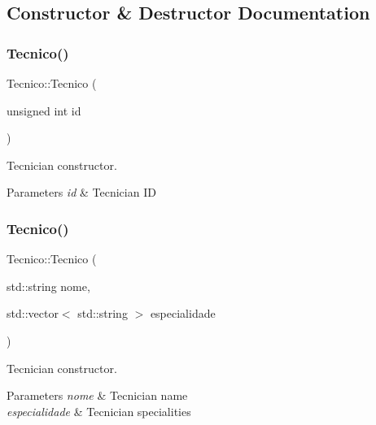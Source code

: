 \subsection{Constructor \& Destructor Documentation}
\mbox{\label{class_tecnico_a9b95e22f7d9328c22ea0e37faf459058}} 
\subsubsection{\texorpdfstring{Tecnico()}{Tecnico()}\hspace{0.1cm}{\footnotesize\ttfamily [1/3]}}
{\footnotesize\ttfamily Tecnico\+::\+Tecnico (\begin{DoxyParamCaption}\item[{unsigned int}]{id }\end{DoxyParamCaption})}



Tecnician constructor. 


\begin{DoxyParams}{Parameters}
{\em id} & Tecnician ID \\
\hline
\end{DoxyParams}
\mbox{\label{class_tecnico_aa6f0757f826239296ab9286149494c1f}} 
\subsubsection{\texorpdfstring{Tecnico()}{Tecnico()}\hspace{0.1cm}{\footnotesize\ttfamily [2/3]}}
{\footnotesize\ttfamily Tecnico\+::\+Tecnico (\begin{DoxyParamCaption}\item[{std\+::string}]{nome,  }\item[{std\+::vector$<$ std\+::string $>$}]{especialidade }\end{DoxyParamCaption})}



Tecnician constructor. 


\begin{DoxyParams}{Parameters}
{\em nome} & Tecnician name \\
\hline
{\em especialidade} & Tecnician specialities \\
\hline
\end{DoxyParams}
\mbox{\label{class_tecnico_a34c9eb9a3a60926081f1023daaa19754}} 
